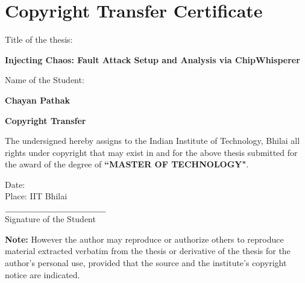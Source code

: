 \chapter*{Copyright Transfer Certificate}

\noindent
\begin{minipage}[c]{0.4\linewidth}
Title of the thesis: \\
\end{minipage} %
\begin{minipage}[c]{0.6\linewidth}
\textbf{Injecting Chaos: Fault Attack Setup
and Analysis via ChipWhisperer}\\
\end{minipage}
\vspace{1em}
\noindent
\begin{minipage}[c]{0.4\linewidth}
Name of the Student:
\end{minipage} %
\vspace{3em}
\begin{minipage}[c]{0.6\linewidth}
\textbf{Chayan Pathak}\\
\end{minipage}
\begin{center}
    \textbf{Copyright Transfer}
\end{center}
\vspace{1.5em}

The undersigned hereby assigns to the Indian Institute of Technology, Bhilai all rights under copyright that may exist in and for the above thesis submitted for the award of the degree of \textbf{``MASTER OF TECHNOLOGY"}.\\

\vspace{4em}
\noindent
\begin{minipage}[c]{0.7\linewidth}
Date: \\
Place: IIT Bhilai\\
\end{minipage} 
\begin{minipage}[c]{0.5\linewidth}
$\underline{\hspace{4.2cm}}$\\
Signature of the Student
\end{minipage}
\vspace{5em}

\textbf{Note:} However the author may reproduce or authorize others to reproduce material extracted verbatim from the thesis or derivative of the thesis for the author's personal use, provided that the source and the institute's copyright notice are indicated.